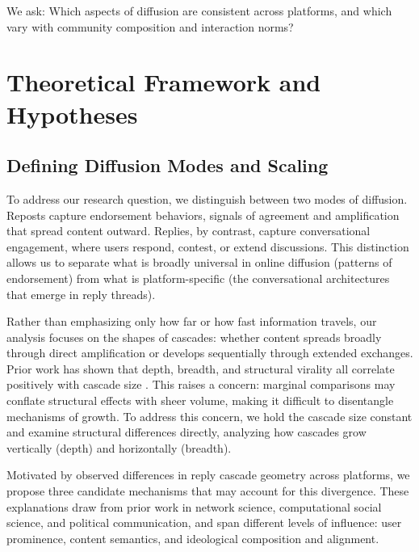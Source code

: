 \documentclass[letterpaper]{article} %
\begin{document}
We ask: Which aspects of diffusion are consistent across platforms, and which vary with community composition and interaction norms? 

\section{Theoretical Framework and Hypotheses}

\subsection{Defining Diffusion Modes and Scaling}
To address our research question, we distinguish between two modes of diffusion. Reposts capture endorsement behaviors, signals of agreement and amplification that spread content outward. Replies, by contrast, capture conversational engagement, where users respond, contest, or extend discussions. This distinction allows us to separate what is broadly universal in online diffusion (patterns of endorsement) from what is platform-specific (the conversational architectures that emerge in reply threads).

Rather than emphasizing only how far or how fast information travels, our analysis focuses on the shapes of cascades: whether content spreads broadly through direct amplification or develops sequentially through extended exchanges. Prior work has shown that depth, breadth, and structural virality all correlate positively with cascade size \cite{juul_comparing_2021}. This raises a concern: marginal comparisons may conflate structural effects with sheer volume, making it difficult to disentangle mechanisms of growth. To address this concern, we hold the cascade size constant and examine structural differences directly, analyzing how cascades grow vertically (depth) and horizontally (breadth). 

Motivated by observed differences in reply cascade geometry across platforms, we propose three candidate mechanisms that may account for this divergence. These explanations draw from prior work in network science, computational social science, and political communication, and span different levels of influence: user prominence, content semantics, and ideological composition and alignment.
\end{document}
